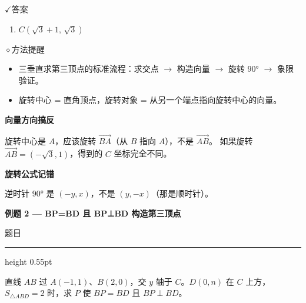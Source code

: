 \documentclass{exam-zh}
\newcommand{\eduSectionTitle}[1]{%
  \needspace{5\baselineskip}%
  \vspace{2mm}
  {\color{edu-blue}\bfseries\large #1}\par
  \vspace{3mm}
}
\newcommand{\eduSubTitle}[1]{%
  \needspace{4\baselineskip}%
  \vspace{1mm}
  {\color{edu-blue}\bfseries #1}\par
  \vspace{1mm}
}
\newcommand{\eduIconCheck}{\(\checkmark\)}
\newcommand{\eduIconPin}{\(\diamond\)}
\newenvironment{eduProblemBlock}[1][题目]{%
  \needspace{8\baselineskip}
  {\small\color{edu-muted}#1}\par
  \vspace{1.5mm}
  {\color{edu-blue}\hrule height 0.55pt}
  \vspace{4.5mm}
  \begingroup
  \color{edu-ink}
  \large
  \setlength{\parskip}{2.2mm}
  \linespread{1.20}\selectfont
}{%
  \par
  \endgroup
  \vspace{6mm}
}
\newenvironment{eduBulletList}{%
  \begin{itemize}[
    label=\textbullet,
    leftmargin=5mm,
    itemsep=1.2mm,
    topsep=0pt,
    parsep=0pt
  ]
}{%
  \end{itemize}
}
\newenvironment{eduBottomGrid}{%
  \vspace{1mm}
  \par\noindent
}{%
  \par\vspace{1mm}
}
\newenvironment{eduSummaryLeft}{%
  \begin{minipage}[t]{0.30\linewidth}
}{%
  \end{minipage}
}
\newcommand{\eduSummaryDivider}{%
  \hspace{4mm}{\color{edu-line}\vrule width 0.35pt}\hspace{7mm}%
}
\newenvironment{eduSummaryRight}{%
  \begin{minipage}[t]{0.58\linewidth}
}{%
  \end{minipage}
}
\newenvironment{eduPlainList}{%
  \begin{enumerate}[
    label=(\arabic*),
    leftmargin=7mm,
    itemsep=1.2mm,
    topsep=0pt,
    parsep=0pt
  ]
}{%
  \end{enumerate}
}
\begin{document}
\begin{eduBottomGrid}
  \begin{eduSummaryLeft}
    \begin{eduSummaryBlock}{\eduIconCheck}{答案}
    \begin{eduPlainList}
      \item $C(\sqrt{3}+1,\,\sqrt{3})$    \end{eduPlainList}
    \end{eduSummaryBlock}
  \end{eduSummaryLeft}
  \eduSummaryDivider
  \begin{eduSummaryRight}
    \begin{eduSummaryBlock}{\eduIconPin}{方法提醒}
    \begin{eduBulletList}
      \item 三垂直求第三顶点的标准流程：求交点 $\to$ 构造向量 $\to$ 旋转 $90°$ $\to$ 象限验证。      \item 旋转中心 = 直角顶点，旋转对象 = 从另一个端点指向旋转中心的向量。    \end{eduBulletList}
    \end{eduSummaryBlock}
  \end{eduSummaryRight}
\end{eduBottomGrid}




\begin{eduMistakeBox}
\eduSubTitle{向量方向搞反}旋转中心是 $A$，应该旋转 $\overrightarrow{BA}$（从 $B$ 指向 $A$），不是 $\overrightarrow{AB}$。
如果旋转 $\overrightarrow{AB} = (-\sqrt{3}, 1)$，得到的 $C$ 坐标完全不同。
\end{eduMistakeBox}




\begin{eduMistakeBox}
\eduSubTitle{旋转公式记错}逆时针 $90°$ 是 $(-y, x)$，不是 $(y, -x)$（那是顺时针）。
\end{eduMistakeBox}



\eduSectionTitle{例题 2 — BP=BD 且 BP⊥BD 构造第三顶点}

\begin{eduProblemBlock}[题目]
直线 $AB$ 过 $A(-1,1)$、$B(2,0)$，交 $y$ 轴于 $C$。$D(0,n)$ 在 $C$ 上方，$S_{\triangle ABD} = 2$ 时，求 $P$ 使 $BP = BD$ 且 $BP \perp BD$。

\end{eduProblemBlock}
\end{document}
